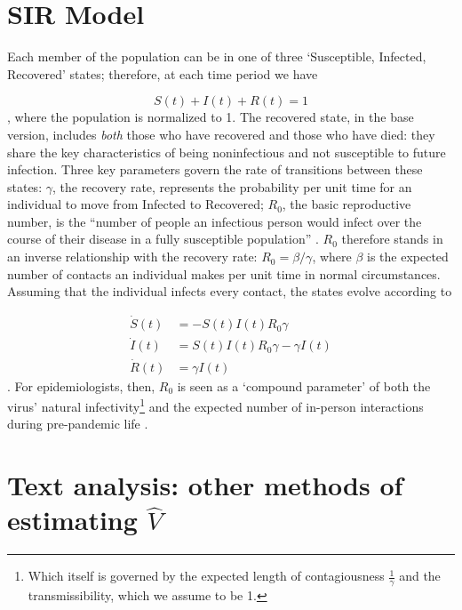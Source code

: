 \documentclass{article}
\begin{document}
\section{SIR Model}\label{sir}
Each member of the population can be in one of three `Susceptible, Infected, Recovered' states; therefore, at each time period we have

\begin{equation}\label{SIRstates}
    S(t) + I(t) + R(t) = 1
\end{equation}
, where the population is normalized to 1. The recovered state, in the base version, includes \textit{both} those who have recovered and those who have died: they share the key characteristics of being noninfectious and not susceptible to future infection. Three key parameters govern the rate of transitions between these states: \(\gamma\), the recovery rate, represents the probability per unit time for an individual to move from Infected to Recovered; \(R_0\), the basic reproductive number, is the ``number of people an infectious person would infect over the course of their disease in a fully susceptible population'' \parencite[81]{averyEconomistGuideEpidemiology2020}. \(R_0\) therefore stands in an inverse relationship with the recovery rate: \(R_0 = \beta / \gamma\), where \(\beta\) is the expected number of contacts an individual makes per unit time in normal circumstances. Assuming that the individual infects every contact, the states evolve according to 

\begin{align}
    \dot{S}(t)&= -S(t)I(t)R_0 \gamma \\
    \dot{I}(t)&= S(t)I(t)R_0 \gamma - \gamma I(t) \\
    \dot{R}(t)&= \gamma I(t)
\end{align}
. For epidemiologists, then, \(R_0\) is seen as a `compound parameter' of both the virus' natural infectivity\footnote{Which itself is governed by the expected length of contagiousness \(\frac{1}{\gamma}\) and the transmissibility, which we assume to be 1.} and the expected number of in-person interactions during pre-pandemic life \parencite[84]{averyEconomistGuideEpidemiology2020}.

\section{Text analysis: other methods of estimating \(\hat{V}\)}
\end{document}
